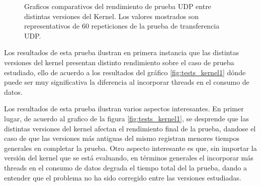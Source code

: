 \begin{figure}[h!]
	\centering
	\hspace*{\fill}
	\hfill
	\caption{Graficos comparativos del rendimiento de prueba UDP entre distintas versiones del Kernel. Los valores mostrados son representativos de 60 repeticiones de la prueba de transferencia UDP.}
	\label{fig:tests_kernel}
	\hspace*{\fill}
\end{figure}

Los resultados de esta prueba ilustran en primera instancia que las distintas versiones del kernel presentan distinto rendimiento sobre el caso de prueba estudiado, ello de acuerdo a los resultados del gráfico \ref{fig:tests_kernel1} dónde puede ser muy significativa la diferencia al incorporar threads en el consumo de datos.

Los resultados de esta prueba ilustran varios aspectos interesantes. En primer lugar, de acuerdo al grafico de la figura \ref{fig:tests_kernel1}, se desprende que las distintas versiones del kernel afectan el rendimiento final de la prueba, dandose el caso de que las versiones más antiguas del mismo registran menores tiempos generales en completar la prueba. Otro aspecto interesante es que, sin importar la versión del kernel que se está evaluando, en términos generales el incorporar más threads en el consumo de datos degrada el tiempo total del la prueba, dando a entender que el problema no ha sido corregido entre las versiones estudiadas.

